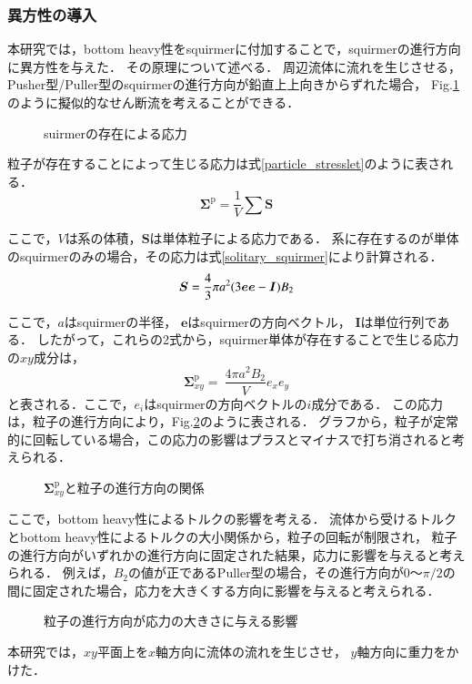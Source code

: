 \subsubsection{異方性の導入}
本研究では，bottom heavy性をsquirmerに付加することで，squirmerの進行方向に異方性を与えた．
その原理について述べる．
周辺流体に流れを生じさせる，Pusher型/Puller型のsquirmerの進行方向が鉛直上上向きからずれた場合，
Fig.\ref{anisotropy}のように擬似的なせん断流を考えることができる．
    \begin{figure}[htbp]
        \label{anisotropy}
        \caption{suirmerの存在による応力}
    \end{figure}

\noindent
粒子が存在することによって生じる応力は式\eqref{particle_stresslet}のように表される\cite{}．
    \begin{equation}
        \boldsymbol{\Sigma}^\mathrm{p} = \frac{1}{V} \sum \boldsymbol{S}
        \label{particle_stresslet}
    \end{equation}

\noindent
ここで，$V$は系の体積，$\boldsymbol{S}$は単体粒子による応力である．
系に存在するのが単体のsquirmerのみの場合，その応力は式\eqref{solitary_squirmer}により計算される\cite{}．
    \begin{equation}
        \boldsymbol{S} = \\
            \frac{4}{3} \pi a^2 (3 \boldsymbol{e} \boldsymbol{e} - \boldsymbol{I}) B_2
        \label{solitary_squirmer}
    \end{equation}

\noindent
ここで，$a$はsquirmerの半径，
$\boldsymbol{e}$はsquirmerの方向ベクトル，
$\boldsymbol{I}$は単位行列である．
したがって，これらの2式から，squirmer単体が存在することで生じる応力の$xy$成分は，
    \begin{equation}
        \boldsymbol{\Sigma}^\mathrm{p}_{xy} = \
            \frac{4 \pi a^2 B_2}{V} e_x e_y
    \end{equation}
と表される．ここで，$e_i$はsquirmerの方向ベクトルの$i$成分である．
この応力は，粒子の進行方向により，Fig.\ref{graph_particle_stresslet}のように表される．
グラフから，粒子が定常的に回転している場合，この応力の影響はプラスとマイナスで打ち消されると考えられる．
    \begin{figure}[htbp]
        \label{graph_particle_stresslet}
        \caption{$\boldsymbol{\Sigma}^\mathrm{p}_{xy}$と粒子の進行方向の関係}
    \end{figure}

\noindent
ここで，bottom heavy性によるトルクの影響を考える．
流体から受けるトルクとbottom heavy性によるトルクの大小関係から，粒子の回転が制限され，
粒子の進行方向がいずれかの進行方向に固定された結果，応力に影響を与えると考えられる．
例えば，$B_2$の値が正であるPuller型の場合，その進行方向が$0 〜 \pi / 2$の間に固定された場合，応力を大きくする方向に影響を与えると考えられる．
    \begin{figure}[htbp]
        \label{graph_particle_stresslet2}
        \caption{粒子の進行方向が応力の大きさに与える影響}
    \end{figure}

\noindent
本研究では，$xy$平面上を$x$軸方向に流体の流れを生じさせ，
$y$軸方向に重力をかけた．
